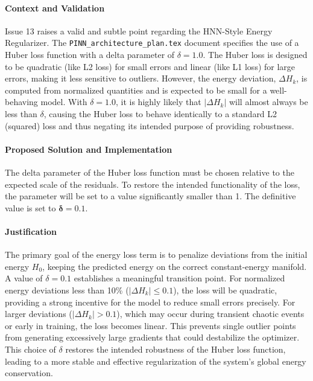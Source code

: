 \paragraph{Context and Validation}
Issue 13 raises a valid and subtle point regarding the HNN-Style Energy Regularizer. The \texttt{PINN\_architecture\_plan.tex} document specifies the use of a Huber loss function with a delta parameter of $\delta = 1.0$. The Huber loss is designed to be quadratic (like L2 loss) for small errors and linear (like L1 loss) for large errors, making it less sensitive to outliers. However, the energy deviation, $\Delta H_k$, is computed from normalized quantities and is expected to be small for a well-behaving model. With $\delta = 1.0$, it is highly likely that $|\Delta H_k|$ will almost always be less than $\delta$, causing the Huber loss to behave identically to a standard L2 (squared) loss and thus negating its intended purpose of providing robustness.

\paragraph{Proposed Solution and Implementation}
The delta parameter of the Huber loss function must be chosen relative to the expected scale of the residuals. To restore the intended functionality of the loss, the parameter will be set to a value significantly smaller than 1. The definitive value is set to $\boldsymbol{\delta = 0.1}$.

\paragraph{Justification}
The primary goal of the energy loss term is to penalize deviations from the initial energy $H_0$, keeping the predicted energy on the correct constant-energy manifold. A value of $\delta = 0.1$ establishes a meaningful transition point. For normalized energy deviations less than 10\% ($|\Delta H_k| \leq 0.1$), the loss will be quadratic, providing a strong incentive for the model to reduce small errors precisely. For larger deviations ($|\Delta H_k| > 0.1$), which may occur during transient chaotic events or early in training, the loss becomes linear. This prevents single outlier points from generating excessively large gradients that could destabilize the optimizer. This choice of $\delta$ restores the intended robustness of the Huber loss function, leading to a more stable and effective regularization of the system's global energy conservation.

